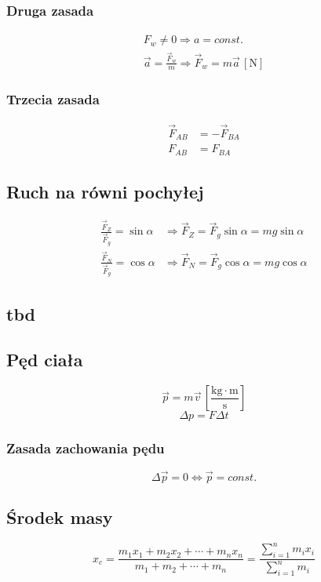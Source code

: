 \documentclass{article}
\numberwithin{equation}{section}
\newcommand{\unit}[1]{\, \left[\mathrm{#1}\right]}
\begin{document}
      \subsubsection{Druga zasada}
        \begin{gather}
          F_w \ne 0 \Rightarrow a = const.\\
          \vec a = \frac{\vec F_w}{m} \Rightarrow \vec F_w = m\vec a \unit{N}
        \end{gather}
      \subsubsection{Trzecia zasada}
        \begin{align}
          \vec F_{AB} &= -\vec F_{BA}\\
          F_{AB} &= F_{BA}
        \end{align}
    \subsection{Ruch na równi pochyłej}
      \begin{align}
        \frac{\vec F_Z}{\vec F_g} = \sin\alpha &\Rightarrow \vec F_Z = \vec F_g\sin\alpha = mg\sin\alpha\\
        \frac{\vec F_N}{\vec F_g} = \cos\alpha &\Rightarrow \vec F_N = \vec F_g\cos\alpha = mg\cos\alpha
      \end{align}
    \subsection{tbd}
    \subsection{Pęd ciała}
      \begin{equation}
        \vec p = m\vec v \unit{\frac{kg\cdot m}{s}}
      \end{equation}
      \begin{equation}
        \Delta p = F\Delta t
      \end{equation}
      \subsubsection{Zasada zachowania pędu}
        \begin{equation}
          \Delta \vec p = 0 \Leftrightarrow \vec p = const.
        \end{equation}
      \subsection{Środek masy}
        \begin{equation}
          x_c = \frac{m_1x_1+m_2x_2+\cdots+m_nx_n}{m_1+m_2+\cdots+m_n} =
          \frac{\sum\limits_{i=1}^n m_ix_i}{\sum\limits_{i=1}^n m_i}
        \end{equation}
\end{document}
